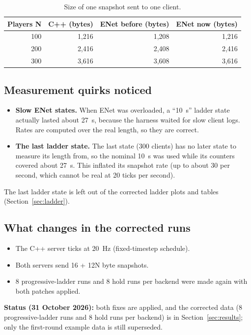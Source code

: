 \documentclass[11pt]{article}
\begin{document}
\begin{table}[H]
\centering
\small
\begin{tabular}{rrrr}
\toprule
Players N & C++ (bytes) & ENet before (bytes) & ENet now (bytes) \\
\midrule
100 & 1,216 & 1,208 & 1,216 \\
200 & 2,416 & 2,408 & 2,416 \\
300 & 3,616 & 3,608 & 3,616 \\
\bottomrule
\end{tabular}
\caption{Size of one snapshot sent to one client.}
\label{tab:snapsize}
\end{table}

\subsection{Measurement quirks noticed}
\begin{itemize}
\item \textbf{Slow ENet states.} When ENet was overloaded, a ``10~s'' ladder state actually lasted about 27~s, because the harness waited for slow client logs. Rates are computed over the real length, so they are correct.
\item \textbf{The last ladder state.} The last state (300 clients) has no later state to measure its length from, so the nominal 10~s was used while its counters covered about 27~s. This inflated its snapshot rate (up to about 30 per second, which cannot be real at 20 ticks per second).
\end{itemize}
The last ladder state is left out of the corrected ladder plots and tables (Section~\ref{sec:ladder}).

\subsection{What changes in the corrected runs}
\begin{itemize}
\item The C++ server ticks at 20~Hz (fixed-timestep schedule).
\item Both servers send 16 + 12N byte snapshots.
\item 8 progressive-ladder runs and 8 hold runs per backend were made again with both patches applied.
\end{itemize}
\textbf{Status (31 October 2026):} both fixes are applied, and the corrected data (8 progressive-ladder runs and 8 hold runs per backend) is in Section~\ref{sec:results}; only the first-round example data is still superseded.
\end{document}
